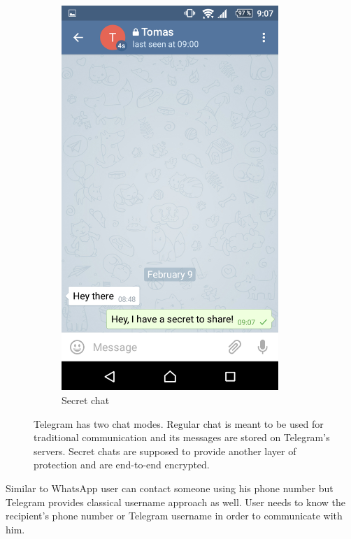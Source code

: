 \documentclass[thesis=M,english]{FITthesis}[2012/10/20]
\begin{document}
\begin{figure}[htb]
\begin{subfigure}[b]{0.4\textwidth}
		\includegraphics[width=0.9\textwidth]{telegram-secret.png}
		\caption{Secret chat}
		\label{img:telegram:secret}
	\end{subfigure}
	\caption[Telegram chat modes]{Telegram has two chat modes. Regular chat is meant to be used for traditional communication and its messages are stored on Telegram's servers. Secret chats are supposed to provide another layer of protection and are end-to-end encrypted.}
\end{figure}

Similar to WhatsApp user can contact someone using his phone number but Telegram provides classical username approach as well. User needs to know the recipient's phone number or Telegram username in order to communicate with him.
\end{document}
